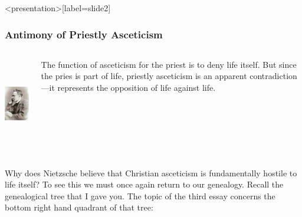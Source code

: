 \begin{frame}<presentation>[label=slide2]
    \frametitle{Antimony of Priestly Asceticism}
        \begin{columns}
            \begin{column}{3cm}
                \includegraphics[height=4cm]{../../../graphics/nietzsche.jpg}
            \end{column}
            \begin{column}{7cm}
                The function of asceticism for the priest is to deny life itself. But since the pries is part of life, priestly asceticism is an apparent contradiction---it represents the opposition of life against life.
            \end{column}
        \end{columns}
\end{frame}

Why does Nietzsche believe that Christian asceticism is fundamentally hostile to life itself? To see this we must once again return to our genealogy. Recall the genealogical tree that I gave you. The topic of the third essay concerns the bottom right hand quadrant of that tree:

\begin{center}
\end{center}

